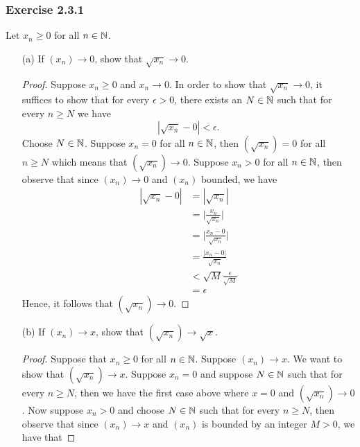 \subsubsection{Exercise 2.3.1} Let \( x_n \geq 0\) for all \( n \in \mathbb{N} \).

\begin{enumerate}
    \item[(a)] If \( (x_n ) \to 0 \), show that \( \sqrt{x_n} \to 0\).
        \begin{proof}
            Suppose \( x_n \geq 0 \) and \( x_n \to 0\). In order to show that \( \sqrt{x_n} \to 0\), it suffices to show that for every \( \epsilon> 0\), there exists an \( N \in \mathbb{N} \) such that for every \( n \geq N \) we have 
            \[ | \sqrt{x_n} - 0  | < \epsilon.\]
            Choose \( N \in \mathbb{N}\). Suppose \( x_n = 0 \) for all \( n \in \mathbb{N} \), then \( ( \sqrt{x_n}) = 0 \) for all \( n \geq N \) which means that \( ( \sqrt{x_n}) \to 0\). Suppose \( x_n > 0 \) for all \( n \in \mathbb{N}\), then observe that since \( (x_n) \to 0\)  and \( (x_n)\) bounded, we have 
            \begin{align*}
             | \sqrt{x_n} - 0 | &= | \sqrt{x_n} | \\
                            &= \Big| \frac{x_n}{ \sqrt{x_n}} \Big| \\
                            &=  \Big| \frac{x_n - 0}{ \sqrt{x_n}} \Big| \\ 
                            &=  \frac{|x_n - 0|}{ \sqrt{x_n}}  \\
                            &< \sqrt{M} \frac{ \epsilon }{ \sqrt{M} }  \\ 
                            &= \epsilon 
            \end{align*}
            Hence, it follows that \( ( \sqrt{x_n}) \to 0\).
        \end{proof}
    \item[(b)] If \( (x_n) \to x\), show that \( (\sqrt{x_n}) \to \sqrt{x}\).
        \begin{proof}
            Suppose that \( x_n \geq 0\) for all \( n \in \mathbb{N} \). Suppose \( (x_n) \to x \). We want to show that \( ( \sqrt{x_n}) \to x\). Suppose \( x_n = 0 \) and suppose \( N \in \mathbb{N} \) such that for every \( n \geq N \), then we have the first case above where \( x=0\) and \( ( \sqrt{x_n}) \to 0\). Now suppose \( x_n > 0 \) and choose \( N \in \mathbb{N} \) such that for every \( n \geq N \), then observe that since \( (x_n ) \to x \) and \( (x_n)\) is bounded by an integer \( M > 0 \), we have that 


\end{proof}
\end{enumerate}
